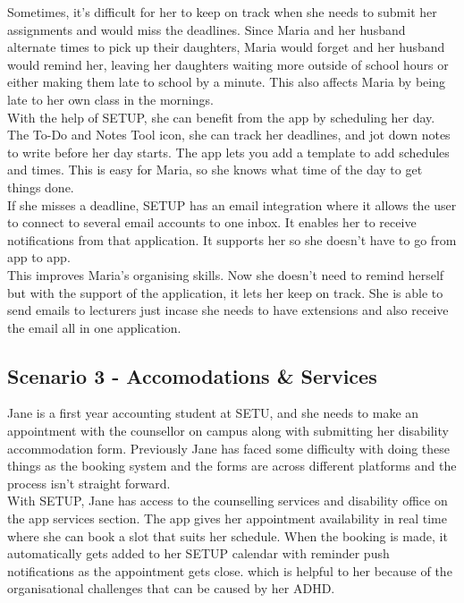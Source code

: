 Sometimes, it's difficult for her to keep on track when she needs to submit her assignments and would miss the deadlines. Since Maria and her husband alternate times to pick up their daughters, Maria would forget and her husband would remind her, leaving her daughters waiting more outside of school hours or either making them late to school by a minute. This also affects Maria by being late to her own class in the mornings.\\

With the help of SETUP, she can benefit from the app by scheduling her day. The To-Do and Notes Tool icon, she can track her deadlines, and jot down notes to write before her day starts. The app lets you add a template to add schedules and times. This is easy for Maria, so she knows what time of the day to get things done.\\

If she misses a deadline, SETUP has an email integration where it allows the user to connect to several email accounts to one inbox. It enables her to receive notifications from that application. It supports her so she doesn't have to go from app to app.\\

This improves Maria's organising skills. Now she doesn't need to remind herself but with the support of the application, it lets her keep on track. She is able to send emails to lecturers just incase she needs to have extensions and also receive the email all in one application. 

\subsection*{Scenario 3 - Accomodations \& Services}
Jane is a first year accounting student at SETU, and she needs to make an appointment with the counsellor on campus along with submitting her disability accommodation form. Previously Jane has faced some difficulty with doing these things as the booking system and the forms are across different platforms and the process isn't straight forward.\\

With SETUP, Jane has access to the counselling services and disability office on the app services section. The app gives her appointment availability in real time where she can book a slot that suits her schedule. When the booking is made, it automatically gets added to her SETUP calendar with reminder push notifications as the appointment gets close. which is helpful to her because of the organisational challenges that can be caused by her ADHD.\\

